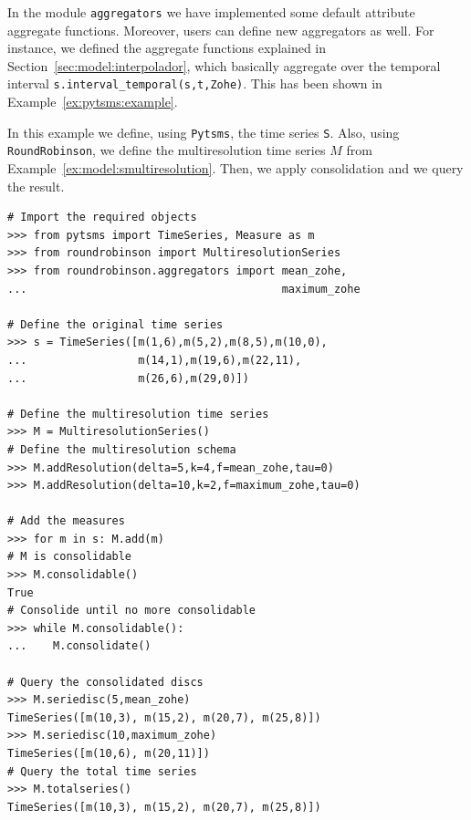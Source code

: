 In the module \texttt{aggregators} we have implemented some default
attribute aggregate functions. Moreover, users can define new
aggregators as well. For instance, we defined the \zohe{} aggregate
functions explained in Section~\ref{sec:model:interpolador}, which
basically aggregate over the temporal interval
\verb|s.interval_temporal(s,t,Zohe)|. This has been shown in
Example~\ref{ex:pytsms:example}.


\begin{example}
  In this example we define, using \texttt{Pytsms}, the time series
  \texttt{S}. Also, using \texttt{RoundRobinson}, we define the
  multiresolution time series $M$ from
  Example~\ref{ex:model:smultiresolution}. Then, we apply
  consolidation and we query the result.

{\small
\begin{verbatim}
# Import the required objects
>>> from pytsms import TimeSeries, Measure as m
>>> from roundrobinson import MultiresolutionSeries
>>> from roundrobinson.aggregators import mean_zohe,
...                                       maximum_zohe

# Define the original time series
>>> s = TimeSeries([m(1,6),m(5,2),m(8,5),m(10,0),
...                 m(14,1),m(19,6),m(22,11),
...                 m(26,6),m(29,0)])

# Define the multiresolution time series
>>> M = MultiresolutionSeries()
# Define the multiresolution schema
>>> M.addResolution(delta=5,k=4,f=mean_zohe,tau=0)
>>> M.addResolution(delta=10,k=2,f=maximum_zohe,tau=0)

# Add the measures
>>> for m in s: M.add(m)
# M is consolidable
>>> M.consolidable()
True
# Consolide until no more consolidable
>>> while M.consolidable():
...    M.consolidate()

# Query the consolidated discs 
>>> M.seriedisc(5,mean_zohe)
TimeSeries([m(10,3), m(15,2), m(20,7), m(25,8)])
>>> M.seriedisc(10,maximum_zohe)
TimeSeries([m(10,6), m(20,11)])
# Query the total time series
>>> M.totalseries()
TimeSeries([m(10,3), m(15,2), m(20,7), m(25,8)])
\end{verbatim}
}
\end{example}






